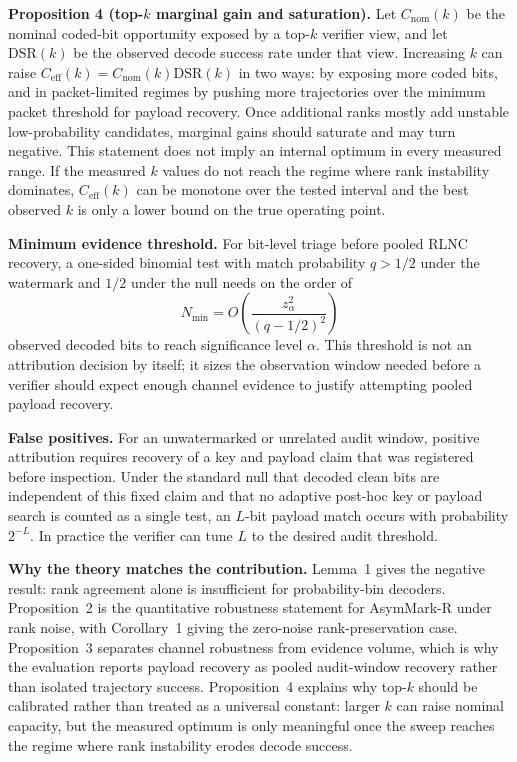 \documentclass[conference,compsoc]{IEEEtran}
\newcommand{\ours}{AsymMark-R}
\newcommand{\Ceff}{\ensuremath{C_{\mathrm{eff}}}}
\begin{document}
\textbf{Proposition 4 (top-$k$ marginal gain and saturation).}
Let $C_{\mathrm{nom}}(k)$ be the nominal coded-bit opportunity exposed by a top-$k$ verifier view, and let $\mathrm{DSR}(k)$ be the observed decode success rate under that view. Increasing $k$ can raise $\Ceff(k)=C_{\mathrm{nom}}(k)\mathrm{DSR}(k)$ in two ways: by exposing more coded bits, and in packet-limited regimes by pushing more trajectories over the minimum packet threshold for payload recovery. Once additional ranks mostly add unstable low-probability candidates, marginal gains should saturate and may turn negative. This statement does not imply an internal optimum in every measured range. If the measured $k$ values do not reach the regime where rank instability dominates, $\Ceff(k)$ can be monotone over the tested interval and the best observed $k$ is only a lower bound on the true operating point.

\textbf{Minimum evidence threshold.}
For bit-level triage before pooled RLNC recovery, a one-sided binomial test with match probability $q>1/2$ under the watermark and $1/2$ under the null needs on the order of
\begin{equation}
  N_{\min} = O\!\left(\frac{z_\alpha^2}{(q-1/2)^2}\right)
\end{equation}
observed decoded bits to reach significance level $\alpha$. This threshold is not an attribution decision by itself; it sizes the observation window needed before a verifier should expect enough channel evidence to justify attempting pooled payload recovery.

\textbf{False positives.}
For an unwatermarked or unrelated audit window, positive attribution requires recovery of a key and payload claim that was registered before inspection. Under the standard null that decoded clean bits are independent of this fixed claim and that no adaptive post-hoc key or payload search is counted as a single test, an $L$-bit payload match occurs with probability $2^{-L}$. In practice the verifier can tune $L$ to the desired audit threshold.

\textbf{Why the theory matches the contribution.}
Lemma~1 gives the negative result: rank agreement alone is insufficient for probability-bin decoders. Proposition~2 is the quantitative robustness statement for \ours{} under rank noise, with Corollary~1 giving the zero-noise rank-preservation case. Proposition~3 separates channel robustness from evidence volume, which is why the evaluation reports payload recovery as pooled audit-window recovery rather than isolated trajectory success. Proposition~4 explains why top-$k$ should be calibrated rather than treated as a universal constant: larger $k$ can raise nominal capacity, but the measured optimum is only meaningful once the sweep reaches the regime where rank instability erodes decode success.
\end{document}
